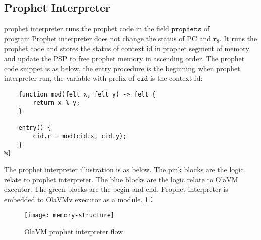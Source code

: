 \subsection{Prophet Interpreter}\label{subsec: prophet-interpreter}
prophet interpreter runs the prophet code in the field $\texttt{prophets}$ of program.Prophet interpreter does not change the status of PC and $\texttt{r}_{8}$.
It runs the prophet code and stores the status of context id in prophet segment of memory and update the PSP to free prophet memory in ascending order.
The prophet code snippet is as below, the entry procedure is the beginning when prophet interpreter run, the variable with prefix of $\texttt{cid}$ is the context id:
\begin{lstlisting}[label={lst:prophet-demo}]
%{
    function mod(felt x, felt y) -> felt {
        return x % y;
    }

    entry() {
        cid.r = mod(cid.x, cid.y);
    }
%}
\end{lstlisting}

The prophet interpreter illustration is as below.
The pink blocks are the logic relate to prophet interpreter.
The blue blocks are the logic relate to OlaVM executor.
The green blocks are the begin and end.
Prophet interpreter is embedded to OlaVMv executor as a module.
\ref{fig: prophet-interpreter-logic}：
\begin{figure}[!htp]
    \centering
    \texttt{[image: memory-structure]}
    \caption{OlaVM prophet interpreter flow}
    \label{fig: prophet-interpreter-logic}
\end{figure}
